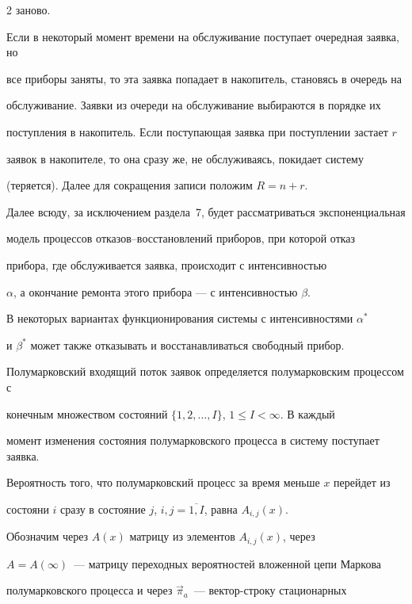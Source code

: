 \begin{multicols}{2}
заново.





Если в некоторый момент времени на обслуживание поступает очередная заявка, но 


все приборы заняты, то эта заявка попадает в накопитель, становясь в очередь на 


обслуживание. Заявки из очереди на обслуживание выбираются в порядке их 


поступления в накопитель. Если поступающая заявка при поступлении застает $r$ 


заявок в накопителе, то она сразу же, не обслуживаясь, покидает систему 


(теряется). Далее для сокращения записи положим $R=n+r$.





Далее всюду, за исключением раздела~7, будет рассматриваться экспоненциальная


модель процессов отказов--восстановлений приборов, при которой отказ


прибора, где обслуживается заявка, происходит с интенсивностью


$\alpha$, а окончание ремонта этого прибора --- с интенсивностью $\beta$.


В некоторых вариантах функционирования системы с интенсивностями $\alpha^*$


и $\beta^*$ может также отказывать и восстанавливаться свободный прибор.





Полумарковский входящий поток заявок определяется полумарковским процессом с 


конечным множеством состояний $\{1,2,\ldots,I\}$, $1\le I<\infty$. В каждый 


момент изменения состояния полумарковского процесса в систему поступает заявка. 


Вероятность того, что полумарковский процесс за время меньше $x$ перейдет из 


состояни $i$ сразу в состояние $j$, $i,j=\overline{1,I}$, равна $A_{i,j}(x)$. 


Обозначим через $A(x)$ матрицу из элементов $A_{i,j}(x)$, через 


$A=A(\infty)$~--- матрицу переходных вероятностей вложенной цепи Маркова 


полумарковского процесса и через $\vec\pi_a$~--- вектор-строку стационарных 



\end{multicols}
